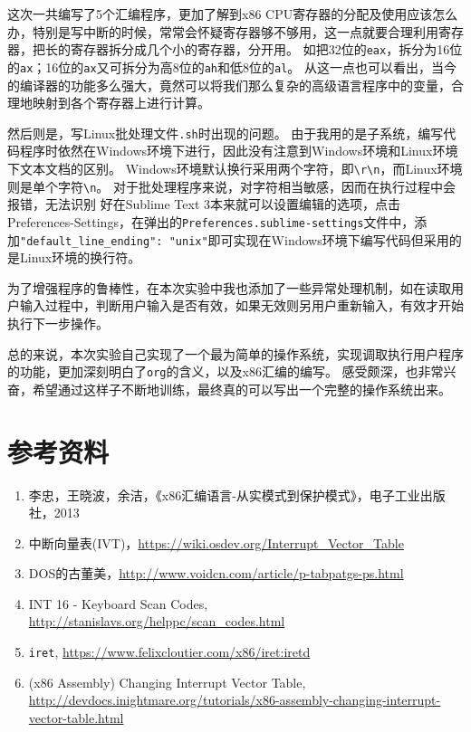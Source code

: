 \documentclass[logo,reportComp]{thesis}
\begin{document}
这次一共编写了5个汇编程序，更加了解到x86 CPU寄存器的分配及使用应该怎么办，特别是写中断的时候，常常会怀疑寄存器够不够用，这一点就要合理利用寄存器，把长的寄存器拆分成几个小的寄存器，分开用。
如把32位的\verb'eax'，拆分为16位的\verb'ax'；16位的\verb'ax'又可拆分为高8位的\verb'ah'和低8位的\verb'al'。
从这一点也可以看出，当今的编译器的功能多么强大，竟然可以将我们那么复杂的高级语言程序中的变量，合理地映射到各个寄存器上进行计算。

然后则是，写Linux批处理文件\verb'.sh'时出现的问题。
由于我用的是子系统，编写代码程序时依然在Windows环境下进行，因此没有注意到Windows环境和Linux环境下文本文档的区别。
Windows环境默认换行采用两个字符，即\verb'\r\n'，而Linux环境则是单个字符\verb'\n'。
对于批处理程序来说，对字符相当敏感，因而在执行过程中会报错，无法识别
好在Sublime Text 3本来就可以设置编辑的选项，点击Preferences-Settings，在弹出的\verb'Preferences.sublime-settings'文件中，添加\verb'"default_line_ending": "unix"'即可实现在Windows环境下编写代码但采用的是Linux环境的换行符。

为了增强程序的鲁棒性，在本次实验中我也添加了一些异常处理机制，如在读取用户输入过程中，判断用户输入是否有效，如果无效则另用户重新输入，有效才开始执行下一步操作。

总的来说，本次实验自己实现了一个最为简单的操作系统，实现调取执行用户程序的功能，更加深刻明白了\verb'org'的含义，以及x86汇编的编写。
感受颇深，也非常兴奋，希望通过这样子不断地训练，最终真的可以写出一个完整的操作系统出来。

\section{参考资料}
\begin{enumerate}
	\item 李忠，王晓波，余洁，《x86汇编语言-从实模式到保护模式》，电子工业出版社，2013
	\item 中断向量表(IVT)，\url{https://wiki.osdev.org/Interrupt_Vector_Table}
	\item DOS的古董美，\url{http://www.voidcn.com/article/p-tabpatgs-ps.html}
	\item INT 16 - Keyboard Scan Codes, \url{http://stanislavs.org/helppc/scan_codes.html}
	\item \verb'iret', \url{https://www.felixcloutier.com/x86/iret:iretd}
	\item (x86 Assembly) Changing Interrupt Vector Table, \url{http://devdocs.inightmare.org/tutorials/x86-assembly-changing-interrupt-vector-table.html}
\end{enumerate}
\end{document}
